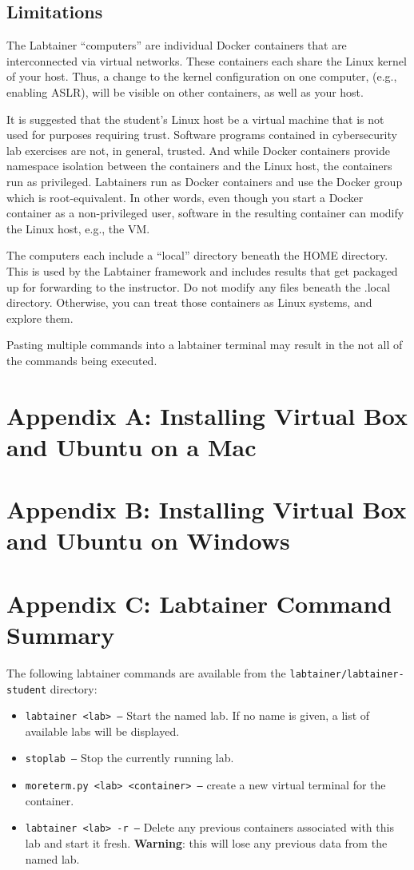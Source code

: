 \documentclass[12pt]{article}
\begin{document}
\subsection{Limitations}
The Labtainer ``computers'' are individual Docker containers that are interconnected via virtual
networks.  These containers each share the Linux kernel of your host.  Thus, a change
to the kernel configuration on one computer, (e.g., enabling ASLR), will be visible on
other containers, as well as your host.

It is suggested that the student's Linux host be a virtual machine that is
not used for purposes requiring trust.  Software programs contained in cybersecurity lab
exercises are not, in general, trusted.  And while Docker containers provide namespace
isolation between the containers and the Linux host, the containers run as privileged.
Labtainers run as Docker containers and use the Docker group 
which is root-equivalent.  In other words, even though you start a Docker container
as a non-privileged user, software in the resulting container can modify the Linux host,
e.g., the VM.

The computers each include a ``local'' directory beneath the HOME directory.  This is used
by the Labtainer framework and includes results that get packaged up for forwarding to the
instructor.  Do not modify any files beneath the .local directory.  Otherwise, you can treat
those containers as Linux systems, and explore them.

Pasting multiple commands into a labtainer terminal may result in the not all of the
commands being executed.


\appendix 
\section {Appendix A: Installing Virtual Box and Ubuntu on a Mac}

\appendix 
\section {Appendix B: Installing Virtual Box and Ubuntu on Windows}

\appendix 
\section {Appendix C: Labtainer Command Summary}
\label{sec:appendixC}
The following labtainer commands are available from the \texttt{labtainer/labtainer-student}
directory:
\begin{itemize}
\item \texttt{labtainer <lab> --}
Start the named lab.  If no name is given, a list of available labs will be displayed.
\item \texttt{stoplab  --} Stop the currently running lab.
\item \texttt{moreterm.py <lab> <container> --} create a new virtual terminal for the container.
\item \texttt{labtainer <lab> -r --}
Delete any previous containers associated with this lab and start it fresh.  \textbf{Warning}: this will lose any
previous data from the named lab.
\end{itemize}
\end{document}
